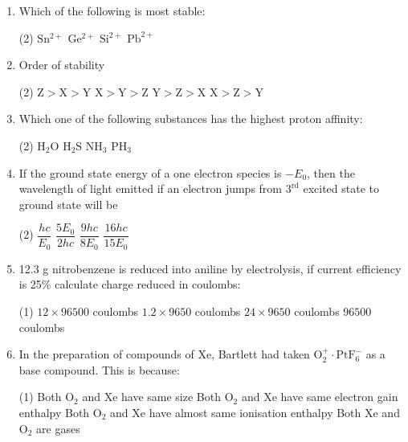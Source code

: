 \documentclass[twocolumn]{article}
\renewcommand{\frac}[2]{\dfrac{#1}{#2}}
\begin{document}
\begin{enumerate}
    \item Which of the following is most stable:
    \begin{tasks}(2)
        \task \( \mathrm{Sn^{2+}} \)
        \task \( \mathrm{Ge^{2+}} \)
        \task \( \mathrm{Si^{2+}} \)
        \task \( \mathrm{Pb^{2+}} \)
    \end{tasks}
    
    \item Order of stability
    \begin{center}
    \end{center}
    \begin{tasks}(2)
        \task \( \mathrm{Z > X > Y} \)
        \task \( \mathrm{X > Y > Z} \)
        \task \( \mathrm{Y > Z > X} \)
        \task \( \mathrm{X > Z > Y} \)
    \end{tasks}
    
    \item Which one of the following substances has the highest proton affinity:
    \begin{tasks}(2)
        \task \( \mathrm{H_2O} \)
        \task \( \mathrm{H_2S} \)
        \task \( \mathrm{NH_3} \)
        \task \( \mathrm{PH_3} \)
    \end{tasks}
    
    \item If the ground state energy of a one electron species is \(-E_0\), then the wavelength of light emitted if an electron jumps from \(3^\text{rd}\) excited state to ground state will be
    \begin{tasks}(2)
        \task \( \frac{hc}{E_0} \)
        \task \( \frac{5E_0}{2hc} \)
        \task \( \frac{9hc}{8E_0} \)
        \task \( \frac{16hc}{15E_0} \)
    \end{tasks}
    
    \item 12.3 g nitrobenzene is reduced into aniline by electrolysis, if current efficiency is 25\% calculate charge reduced in coulombs:
    \begin{tasks}(1)
        \task \( 12 \times 96500 \) coulombs
        \task \( 1.2 \times 9650 \) coulombs
        \task \( 24 \times 9650 \) coulombs
        \task \( 96500 \) coulombs
    \end{tasks}
    
    \item In the preparation of compounds of Xe, Bartlett had taken \( \mathrm{O_2^+}\cdot\mathrm{PtF_6^-} \) as a base compound. This is because:
    \begin{tasks}(1)
        \task Both \( \mathrm{O_2} \) and Xe have same size
        \task Both \( \mathrm{O_2} \) and Xe have same electron gain enthalpy
        \task Both \( \mathrm{O_2} \) and Xe have almost same ionisation enthalpy
        \task Both Xe and \( \mathrm{O_2} \) are gases
    \end{tasks}


\end{enumerate}
\end{document}
